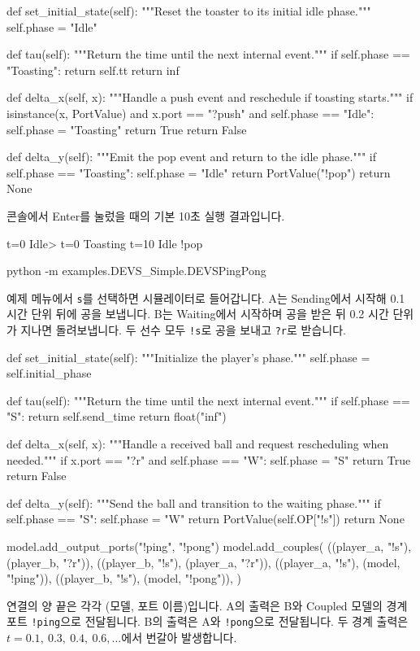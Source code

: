 \documentclass[11pt,a4paper]{article}
\newcommand{\api}[1]{\texttt{#1}}
\newcommand{\chaptermark}[1]{\par\noindent{\LARGE\color{ink}\bfseries #1}\par\smallskip}
\newcommand{\topic}[1]{\par\medskip{\large\color{accent}\bfseries #1}\par}
\begin{document}
\begin{Code}
def set_initial_state(self):
        """Reset the toaster to its initial idle phase."""
        self.phase = "Idle"

def tau(self):
        """Return the time until the next internal event."""
        if self.phase == "Toasting":
            return self.tt
        return inf

def delta_x(self, x):
        """Handle a push event and reschedule if toasting starts."""
        if isinstance(x, PortValue) and x.port == "?push" and self.phase == "Idle":
            self.phase = "Toasting"
            return True
        return False

def delta_y(self):
        """Emit the pop event and return to the idle phase."""
        if self.phase == "Toasting":
            self.phase = "Idle"
            return PortValue("!pop")
        return None
\end{Code}
콘솔에서 Enter를 눌렀을 때의 기본 10초 실행 결과입니다.
\begin{Code}
t=0 Idle> t=0 Toasting
t=10 Idle !pop
\end{Code}

\newpage
\chaptermark{2.1 \enspace DEVS (계속)}
\topic{2.1.3 \enspace DEVSPingPong}
\begin{Code}
python -m examples.DEVS_Simple.DEVSPingPong
\end{Code}
예제 메뉴에서 \api{s}를 선택하면 시뮬레이터로 들어갑니다.
A는 Sending에서 시작해 0.1 시간 단위 뒤에 공을 보냅니다.
B는 Waiting에서 시작하며 공을 받은 뒤 0.2 시간 단위가 지나면 돌려보냅니다.
두 선수 모두 \api{!s}로 공을 보내고 \api{?r}로 받습니다.

\begin{Code}
def set_initial_state(self):
        """Initialize the player's phase."""
        self.phase = self.initial_phase

def tau(self):
        """Return the time until the next internal event."""
        if self.phase == "S":
            return self.send_time
        return float("inf")

def delta_x(self, x):
        """Handle a received ball and request rescheduling when needed."""
        if x.port == "?r" and self.phase == "W":
            self.phase = "S"
            return True
        return False

def delta_y(self):
        """Send the ball and transition to the waiting phase."""
        if self.phase == "S":
            self.phase = "W"
            return PortValue(self.OP["!s"])
        return None
\end{Code}
\begin{Code}
model.add_output_ports("!ping", "!pong")
model.add_couples(
    ((player_a, "!s"), (player_b, "?r")),
    ((player_b, "!s"), (player_a, "?r")),
    ((player_a, "!s"), (model, "!ping")),
    ((player_b, "!s"), (model, "!pong")),
)
\end{Code}
연결의 양 끝은 각각 (모델, 포트 이름)입니다.
A의 출력은 B와 Coupled 모델의 경계 포트 \api{!ping}으로 전달됩니다.
B의 출력은 A와 \api{!pong}으로 전달됩니다.
두 경계 출력은 \(t=0.1,\ 0.3,\ 0.4,\ 0.6,\ldots\)에서 번갈아 발생합니다.
\end{document}
